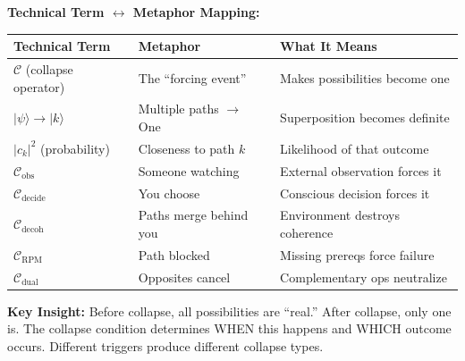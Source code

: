 \documentclass[11pt,twoside]{book}
\newcommand{\Collapse}{\mathcal{C}}
\begin{document}
\begin{tcolorbox}[colback=green!5!white,colframe=green!65!black,title=\textbf{Plain English: What is a Collapse Condition?},breakable]
\textbf{Technical Term $\leftrightarrow$ Metaphor Mapping:}
\begin{center}
\footnotesize
\begin{tabularx}{\textwidth}{>{\raggedright\arraybackslash}X|>{\raggedright\arraybackslash}X|>{\raggedright\arraybackslash}X}
\toprule
\textbf{Technical Term} & \textbf{Metaphor} & \textbf{What It Means} \\
\midrule
$\Collapse$ (collapse operator) & The ``forcing event'' & Makes possibilities become one \\
$|\psi\rangle \to |k\rangle$ & Multiple paths $\to$ One & Superposition becomes definite \\
$|c_k|^2$ (probability) & Closeness to path $k$ & Likelihood of that outcome \\
$\Collapse_{\mathrm{obs}}$ & Someone watching & External observation forces it \\
$\Collapse_{\mathrm{decide}}$ & You choose & Conscious decision forces it \\
$\Collapse_{\mathrm{decoh}}$ & Paths merge behind you & Environment destroys coherence \\
$\Collapse_{\mathrm{RPM}}$ & Path blocked & Missing prereqs force failure \\
$\Collapse_{\mathrm{dual}}$ & Opposites cancel & Complementary ops neutralize \\
\bottomrule
\end{tabularx}
\end{center}

\textbf{Key Insight:}
Before collapse, all possibilities are ``real.'' After collapse, only one is. The collapse condition determines WHEN this happens and WHICH outcome occurs. Different triggers produce different collapse types.

\end{tcolorbox}
\end{document}
